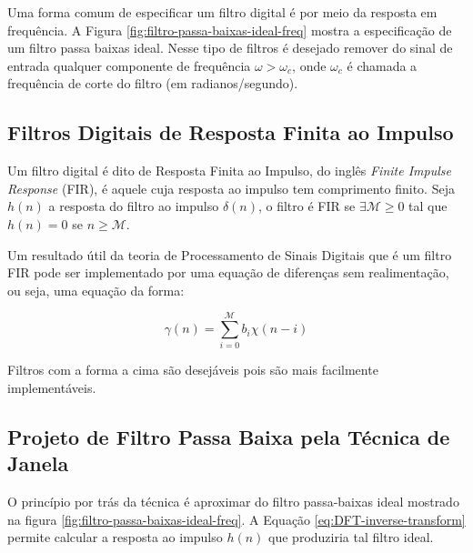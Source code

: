 {Uma forma comum de especificar um filtro digital é por meio da resposta em frequência. A Figura \ref{fig:filtro-passa-baixas-ideal-freq} mostra a especificação de um filtro passa baixas ideal. Nesse tipo de filtros é desejado remover do sinal de entrada qualquer componente de frequência $\omega > \omega_c$, onde $\omega_c$ é chamada a frequência de corte do filtro (em radianos/segundo).

\subsection{Filtros Digitais de Resposta Finita ao Impulso}

Um filtro digital é dito de  Resposta Finita ao Impulso, do inglês \textit{Finite Impulse Response} (FIR), é aquele cuja resposta ao impulso tem comprimento finito. Seja $h(n)$ a resposta do filtro ao impulso $\delta(n)$, o filtro é FIR se $\exists \mathcal{M} \geq 0$ tal que $h(n) = 0$ se $n \geq \mathcal{M}$.

Um resultado útil da teoria de Processamento de Sinais Digitais que é um filtro FIR pode ser implementado por uma equação de diferenças sem realimentação, ou seja, uma equação da forma:

\begin{equation}
    \gamma(n) = 	\sum_{i=0}^{\mathcal{M}} b_i \chi(n-i)
\end{equation}

Filtros com a forma a cima são desejáveis pois são mais facilmente implementáveis.

\subsection{Projeto de Filtro Passa Baixa pela Técnica de Janela}

O princípio por trás da técnica é aproximar do filtro passa-baixas ideal
mostrado na figura \ref{fig:filtro-passa-baixas-ideal-freq}. A Equação \ref{eq:DFT-inverse-transform}
 permite calcular a resposta ao impulso $h(n)$ que produziria tal filtro ideal.

}
